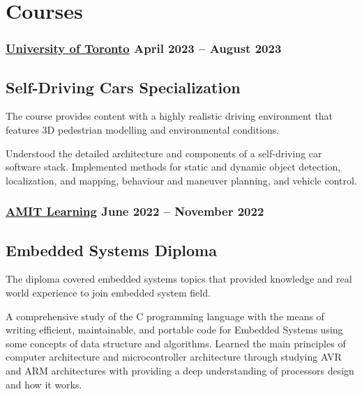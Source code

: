 \medskip
\section*{Courses}
%
%
%
\subsubsection*{
  \href{https://www.coursera.org/specializations/self-driving-cars}{University of Toronto}
  \hspace*{\fill}
  April 2023 -- August 2023
}
\subsection*{Self-Driving Cars Specialization}
The course provides content with a highly realistic driving environment that
features 3D pedestrian modelling and environmental conditions.
\smallskip
\begin{tasks}
  \task Understood the detailed architecture and components of a self-driving car software stack.
  \task Implemented methods for static and dynamic object detection, localization, and mapping, behaviour and maneuver planning, and vehicle control.
\end{tasks}
%
%
\medskip
\subsubsection*{
  \href{https://amit-learning.com/}{AMIT Learning}
  \hspace*{\fill}
  June 2022 -- November 2022
}
\subsection*{Embedded Systems Diploma}
The diploma covered embedded systems topics that provided knowledge and real world experience to join embedded system field.
\smallskip
\begin{tasks}
  \task A comprehensive study of the C programming language with the means of writing efficient, maintainable, and portable code for Embedded Systems using some concepts of data structure and algorithms.
  \task Learned the main principles of computer architecture and microcontroller architecture through studying AVR and ARM architectures with providing a deep understanding of processors design and how it works.
\end{tasks}